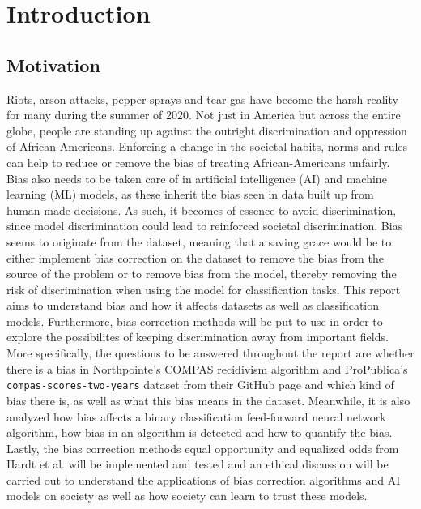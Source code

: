 \documentclass[11pt, fleqn, titlepage]{article}
\begin{document}
	\section{Introduction} \label{indledning}
	
	\subsection{Motivation}
	
	Riots, arson attacks, pepper sprays and tear gas have become the harsh reality for many during the summer of 2020. Not just in America but across the entire globe, people are standing up against the outright discrimination and oppression of African-Americans. Enforcing a change in the societal habits, norms and rules can help to reduce or remove the bias of treating African-Americans unfairly. Bias also needs to be taken care of in artificial intelligence (AI) and machine learning (ML) models, as these inherit the bias seen in data built up from human-made decisions. As such, it becomes of essence to avoid discrimination, since model discrimination could lead to reinforced societal discrimination. Bias seems to originate from the dataset, meaning that a saving grace would be to either implement bias correction on the dataset to remove the bias from the source of the problem or to remove bias from the model, thereby removing the risk of discrimination when using the model for classification tasks. This report aims to understand bias and how it affects datasets as well as classification models. Furthermore, bias correction methods will be put to use in order to explore the possibilites of keeping discrimination away from important fields. More specifically, the questions to be answered throughout the report are whether there is a bias in Northpointe's COMPAS recidivism algorithm and ProPublica's \texttt{compas-scores-two-years} dataset from their GitHub page and which kind of bias there is, as well as what this bias means in the dataset. Meanwhile, it is also analyzed how bias affects a binary classification feed-forward neural network algorithm, how bias in an algorithm is detected and how to quantify the bias. Lastly, the bias correction methods equal opportunity and equalized odds from Hardt et al. \cite{equal_of_oppor} will be implemented and tested and an ethical discussion will be carried out to understand the applications of bias correction algorithms and AI models on society as well as how society can learn to trust these models. \\
	
\end{document}
